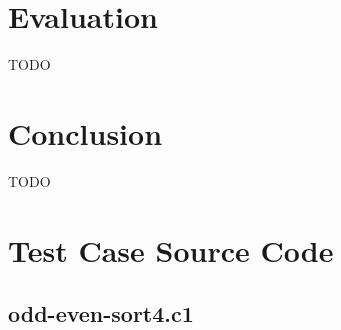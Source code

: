 \documentclass{article}
\begin{document}
\section{Evaluation}

TODO

\section{Conclusion}

TODO

{}


\appendix
\section{Test Case Source Code}
\label{sec:codez}
\subsection{odd-even-sort4.c1}
\small
\end{document}
